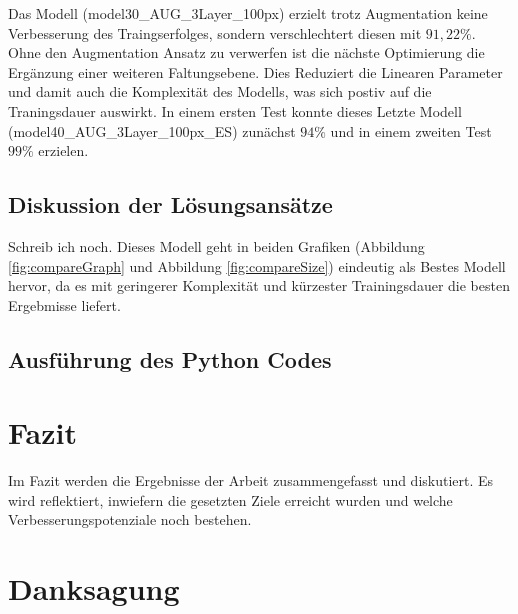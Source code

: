 \documentclass[journal,twoside,web]{ieeecolor}
\begin{document}
Das Modell (model30\_AUG\_3Layer\_100px) erzielt trotz Augmentation keine Verbesserung des Traingserfolges, sondern verschlechtert diesen mit $91,22\%$. 
Ohne den Augmentation Ansatz zu verwerfen ist die nächste Optimierung die Ergänzung einer weiteren Faltungsebene. 
Dies Reduziert die Linearen Parameter und damit auch die Komplexität des Modells, was sich postiv auf die Traningsdauer auswirkt. 
In einem ersten Test konnte dieses Letzte Modell (model40\_AUG\_3Layer\_100px\_ES) zunächst $94\%$ und in einem zweiten Test $99\%$ erzielen.

\subsection{Diskussion der Lösungsansätze}
Schreib ich noch.
Dieses Modell geht in beiden Grafiken (Abbildung \ref{fig:compareGraph} und Abbildung \ref{fig:compareSize}) eindeutig als Bestes Modell hervor, da es mit geringerer Komplexität und kürzester Trainingsdauer die besten Ergebmisse liefert.


\subsection{Ausführung des Python Codes}


\section{Fazit}
Im Fazit werden die Ergebnisse der Arbeit zusammengefasst und diskutiert. Es wird reflektiert, inwiefern die gesetzten Ziele erreicht wurden und welche Verbesserungspotenziale noch bestehen.








\appendices


\section*{Danksagung}
\end{document}
